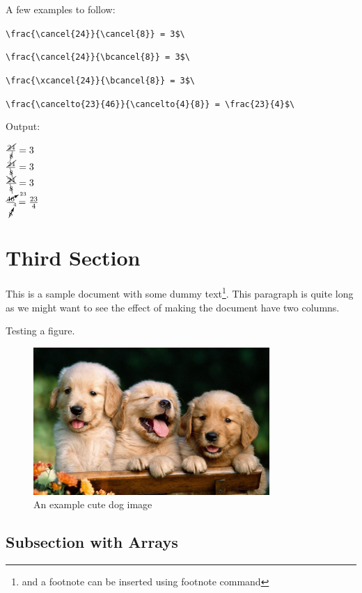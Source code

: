 \documentclass[12]{article}
\begin{document}
    A few examples to follow:

    \verb|\frac{\cancel{24}}{\cancel{8}} = 3$\|

    \verb|\frac{\cancel{24}}{\bcancel{8}} = 3$\|

    \verb|\frac{\xcancel{24}}{\bcancel{8}} = 3$\|

    \verb|\frac{\cancelto{23}{46}}{\cancelto{4}{8}} = \frac{23}{4}$\|

    Output:

    $\frac{\cancel{24}}{\cancel{8}} = 3$   \\
    $\frac{\cancel{24}}{\bcancel{8}} = 3$  \\
    $\frac{\xcancel{24}}{\bcancel{8}} = 3$ \\
    $\frac{\cancelto{23}{46}}{\cancelto{4}{8}} = \frac{23}{4}$ \\

    \section{Third Section}%
    \label{sec:Third Section}

    This is a sample document with some dummy text\footnote{and a footnote can be inserted using footnote command}. This paragraph is quite long as we might want to see the effect of making the document have two columns.


    Testing a figure.
    \begin{figure}[ht]
        \centering
        \includegraphics[width=0.8\textwidth]{Cute-Dog-Photo.jpg}
        \caption{An example cute dog image}
        \label{fig:Cute-Dog-Photo-jpg}
    \end{figure}

    \subsection{Subsection with Arrays}%
    \label{sub:Subsection with Arrays}
    
\end{document}
